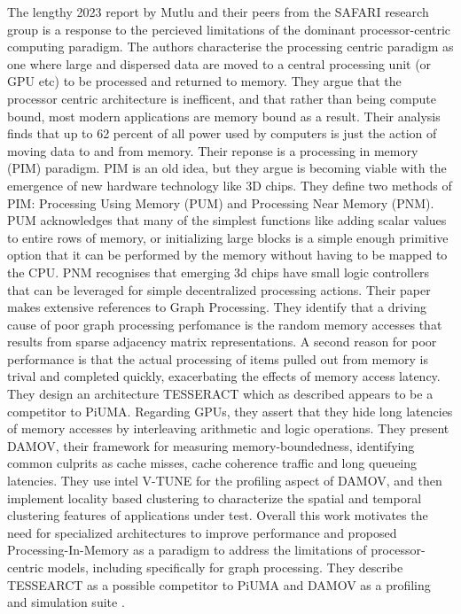 \documentclass[sigconf,authordraft]{acmart}
\begin{document}
\par{The lengthy 2023 report by Mutlu and their peers from the SAFARI research group is a response to the percieved limitations of the dominant processor-centric computing paradigm. 
The authors characterise the processing centric paradigm as one where large and dispersed data are moved to a central processing unit (or GPU etc) to be processed and returned to memory. 
They argue that the processor centric architecture is inefficent, and that rather than being compute bound, most modern applications are memory bound as a result. 
Their analysis finds that up to 62 percent of all power used by computers is just the action of moving data to and from memory. Their reponse is a processing in memory (PIM) paradigm. 
PIM is an old idea, but they argue is becoming viable with the emergence of new hardware technology like 3D chips. 
They define two methods of PIM: Processing Using Memory (PUM) and Processing Near Memory (PNM). 
PUM acknowledges that many of the simplest functions like adding scalar values to entire rows of memory, or initializing large blocks is a simple enough primitive option that it can be performed by the memory without having to be mapped to the CPU. 
PNM recognises that emerging 3d chips have small logic controllers that can be leveraged for simple decentralized processing actions. 
Their paper makes extensive references to Graph Processing. 
They identify that a driving cause of poor graph processing perfomance is the random memory accesses that results from sparse adjacency matrix representations. 
A second reason for poor performance is that the actual processing of items pulled out from memory is trival and completed quickly, exacerbating the effects of memory access latency. 
They design an architecture TESSERACT which as described appears to be a competitor to PiUMA. 
Regarding GPUs, they assert that they hide long latencies of memory accesses by interleaving arithmetic and logic operations. 
They present DAMOV, their framework for measuring memory-boundedness, identifying common culprits as cache misses, cache coherence traffic and long queueing latencies. 
They use intel V-TUNE for the profiling aspect of DAMOV, and then implement locality based clustering to characterize the spatial and temporal clustering features of applications under test. 
Overall this work motivates the need for specialized architectures to improve performance and proposed Processing-In-Memory as a paradigm to address the limitations of processor-centric models, including specifically for graph processing. 
They describe TESSEARCT as a possible competitor to PiUMA and DAMOV as a profiling and simulation suite \cite{Mutlu2023}.}
\end{document}
